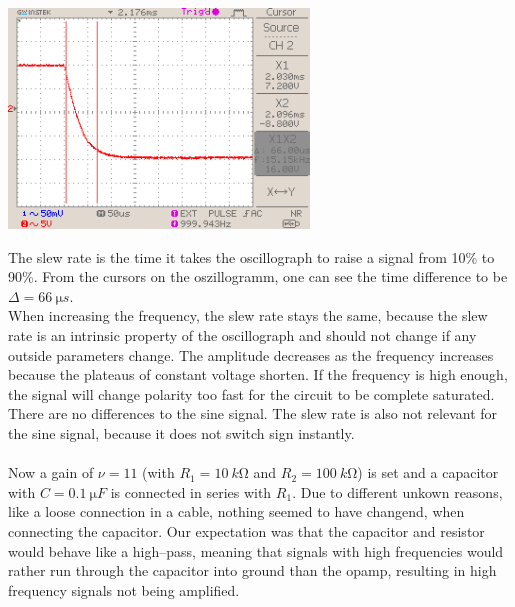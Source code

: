 \documentclass[a4paper,10pt]{article}
\newenvironment{Figure}
        {\par\medskip\noindent\minipage{\linewidth}}
        {\endminipage\par\medskip}
\numberwithin{equation}{section}
\begin{document}
\begin{multicols}{2}
\begin{Figure}
                \includegraphics[width=0.6\textwidth]{../data/DS0026_negate.png}
        \end{Figure}
        \noindent The slew rate is the time it takes the oscillograph to raise a signal from 10\% to 90\%.
        From the cursors on the oszillogramm, one can see the time difference to be $\Delta =\SI{66}{\micro s}$.
        \\\indent When increasing the frequency, the slew rate stays the same, because the slew rate is an intrinsic property of the oscillograph and should not change if any outside parameters change.
        The amplitude decreases as the frequency increases because the plateaus of constant voltage shorten.
        If the frequency is high enough, the signal will change polarity too fast for the circuit to be complete saturated.
        There are no differences to the sine signal.
        The slew rate is also not relevant for the sine signal, because it does not switch sign instantly.
        \\\\ Now a gain of $\nu =11$ (with $R_1=\SI{10}{k\ohm}$ and $R_2=\SI{100}{k\ohm}$) is set and a capacitor with $C=\SI{0.1}{\micro F}$ is connected in series with $R_1$.
        Due to different unkown reasons, like a loose connection in a cable, nothing seemed to have changend, when connecting the capacitor.
        Our expectation was that the capacitor and resistor would behave like a high--pass, meaning that signals with high frequencies would rather run through the capacitor into ground than the opamp, resulting in high frequency signals not being amplified.
\end{multicols}

\clearpage
\listoffigures
\listoftables



\end{document}
